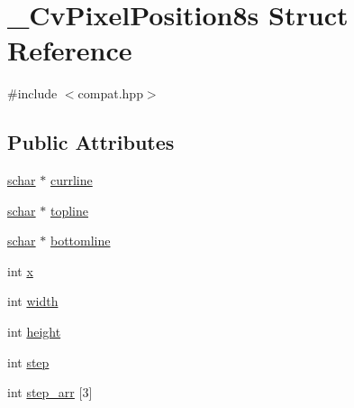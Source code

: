 \hypertarget{struct__CvPixelPosition8s}{\section{\-\_\-\-Cv\-Pixel\-Position8s Struct Reference}
\label{struct__CvPixelPosition8s}
}


{\ttfamily \#include $<$compat.\-hpp$>$}

\subsection*{Public Attributes}
\begin{DoxyCompactItemize}
\item 
\hyperlink{core_2types__c_8h_a0fd9ce9d735064461bebfe6037026093}{schar} $\ast$ \hyperlink{struct__CvPixelPosition8s_a195598512965862f04d0461c4fd68240}{currline}
\item 
\hyperlink{core_2types__c_8h_a0fd9ce9d735064461bebfe6037026093}{schar} $\ast$ \hyperlink{struct__CvPixelPosition8s_a2da220db28fedfab9f85118bd0900967}{topline}
\item 
\hyperlink{core_2types__c_8h_a0fd9ce9d735064461bebfe6037026093}{schar} $\ast$ \hyperlink{struct__CvPixelPosition8s_ae16afa86c3d3beea295ffa226e12b210}{bottomline}
\item 
int \hyperlink{struct__CvPixelPosition8s_af00dfdf2ebf04a50f68d9f186c1f8d25}{x}
\item 
int \hyperlink{struct__CvPixelPosition8s_a8c9a89631cc3148df7a1f6e906f74e53}{width}
\item 
int \hyperlink{struct__CvPixelPosition8s_a2a5e646588415375057ba90645e85a47}{height}
\item 
int \hyperlink{struct__CvPixelPosition8s_abde0a4ee7c6b935886b9263d6fdd76d5}{step}
\item 
int \hyperlink{struct__CvPixelPosition8s_a8019fcb671f632efbb571225e940058b}{step\-\_\-arr} \mbox{[}3\mbox{]}
\end{DoxyCompactItemize}


